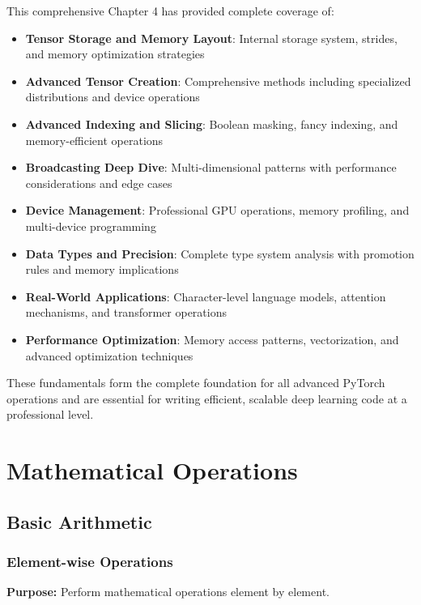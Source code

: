 \documentclass[11pt,a4paper]{book}
\begin{document}
\begin{summarybox}
This comprehensive Chapter 4 has provided complete coverage of:

\begin{itemize}
\item \textbf{Tensor Storage and Memory Layout}: Internal storage system, strides, and memory optimization strategies
\item \textbf{Advanced Tensor Creation}: Comprehensive methods including specialized distributions and device operations
\item \textbf{Advanced Indexing and Slicing}: Boolean masking, fancy indexing, and memory-efficient operations
\item \textbf{Broadcasting Deep Dive}: Multi-dimensional patterns with performance considerations and edge cases  
\item \textbf{Device Management}: Professional GPU operations, memory profiling, and multi-device programming
\item \textbf{Data Types and Precision}: Complete type system analysis with promotion rules and memory implications
\item \textbf{Real-World Applications}: Character-level language models, attention mechanisms, and transformer operations
\item \textbf{Performance Optimization}: Memory access patterns, vectorization, and advanced optimization techniques
\end{itemize}

These fundamentals form the complete foundation for all advanced PyTorch operations and are essential for writing efficient, scalable deep learning code at a professional level.
\end{summarybox}

\chapter{Mathematical Operations}

\section{Basic Arithmetic}

\subsection{Element-wise Operations}

\textbf{Purpose:} Perform mathematical operations element by element.
\end{document}
